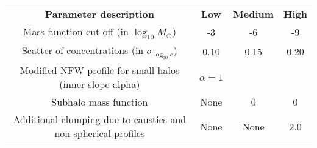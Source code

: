 \begin{table*}
    \begin{tabular}{ c c c c }
    \textbf{Parameter description}  & \textbf{Low} & \textbf{Medium} & \textbf{High} \\
    Mass function cut-off (in $\log_{10}M_\odot$)        & -3 & -6 & -9 \\
    Scatter of concentrations (in $\sigma_{\log_{10}c}$)              & 0.10 & 0.15 & 0.20 \\
    Modified NFW profile for small halos (inner slope alpha) & $\alpha=1$ & \cite{Ishiyama_2014} &  \cite{Ishiyama_2014} \\
    Subhalo mass function & None & 0 & 0 \\
    Additional clumping due to caustics and non-spherical profiles & None & None & 2.0
\\    \end{tabular}
\end{table*}
